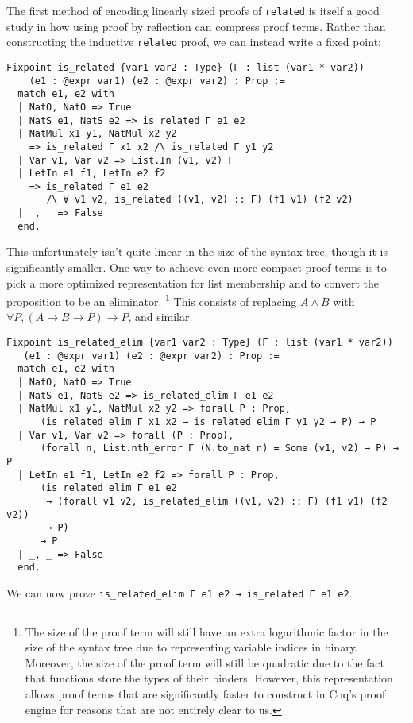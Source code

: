 The first method of encoding linearly sized proofs of \texttt{related} is itself a good study in how using proof by reflection can compress proof terms.
Rather than constructing the inductive \texttt{related} proof, we can instead write a fixed point:
\begin{verbatim}
Fixpoint is_related {var1 var2 : Type} (Γ : list (var1 * var2))
    (e1 : @expr var1) (e2 : @expr var2) : Prop :=
  match e1, e2 with
  | NatO, NatO => True
  | NatS e1, NatS e2 => is_related Γ e1 e2
  | NatMul x1 y1, NatMul x2 y2
    => is_related Γ x1 x2 /\ is_related Γ y1 y2
  | Var v1, Var v2 => List.In (v1, v2) Γ
  | LetIn e1 f1, LetIn e2 f2
    => is_related Γ e1 e2
       /\ ∀ v1 v2, is_related ((v1, v2) :: Γ) (f1 v1) (f2 v2)
  | _, _ => False
  end.
\end{verbatim}
This unfortunately isn't quite linear in the size of the syntax tree, though it is significantly smaller.
One way to achieve even more compact proof terms is to pick a more optimized representation for list membership and to convert the proposition to be an eliminator.%
\footnote{%
  The size of the proof term will still have an extra logarithmic factor in the size of the syntax tree due to representing variable indices in binary.
  Moreover, the size of the proof term will still be quadratic due to the fact that functions store the types of their binders.
  However, this representation allows proof terms that are significantly faster to construct in Coq's proof engine for reasons that are not entirely clear to us.
}
This consists of replacing $A \wedge B$ with $\forall P, (A \to B \to P) \to P$, and similar.
\begin{verbatim}
Fixpoint is_related_elim {var1 var2 : Type} (Γ : list (var1 * var2))
   (e1 : @expr var1) (e2 : @expr var2) : Prop :=
  match e1, e2 with
  | NatO, NatO => True
  | NatS e1, NatS e2 => is_related_elim Γ e1 e2
  | NatMul x1 y1, NatMul x2 y2 => forall P : Prop,
      (is_related_elim Γ x1 x2 → is_related_elim Γ y1 y2 → P) → P
  | Var v1, Var v2 => forall (P : Prop),
      (forall n, List.nth_error Γ (N.to_nat n) = Some (v1, v2) → P) → P
  | LetIn e1 f1, LetIn e2 f2 => forall P : Prop,
      (is_related_elim Γ e1 e2
       → (forall v1 v2, is_related_elim ((v1, v2) :: Γ) (f1 v1) (f2 v2))
       → P)
      → P
  | _, _ => False
  end.
\end{verbatim}
We can now prove \texttt{is_related_elim Γ e1 e2 → is_related Γ e1 e2}.


